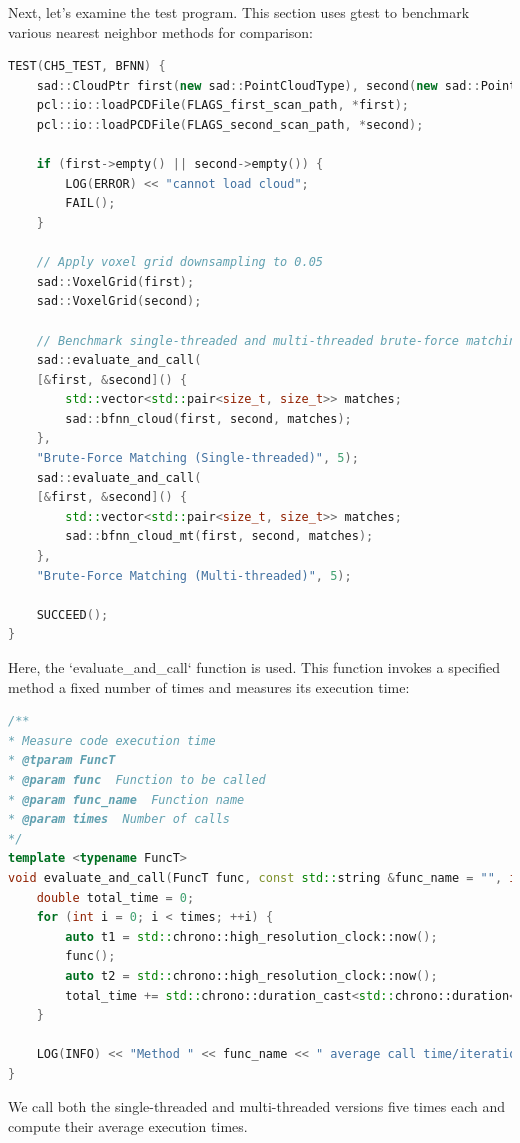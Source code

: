 Next, let's examine the test program. This section uses gtest to benchmark various nearest neighbor methods for comparison:

\begin{lstlisting}[language=c++,caption=src/ch5/test\_nn.cc]
TEST(CH5_TEST, BFNN) {
	sad::CloudPtr first(new sad::PointCloudType), second(new sad::PointCloudType);
	pcl::io::loadPCDFile(FLAGS_first_scan_path, *first);
	pcl::io::loadPCDFile(FLAGS_second_scan_path, *second);
	
	if (first->empty() || second->empty()) {
		LOG(ERROR) << "cannot load cloud";
		FAIL();
	}
	
	// Apply voxel grid downsampling to 0.05
	sad::VoxelGrid(first);
	sad::VoxelGrid(second);
	
	// Benchmark single-threaded and multi-threaded brute-force matching
	sad::evaluate_and_call(
	[&first, &second]() {
		std::vector<std::pair<size_t, size_t>> matches;
		sad::bfnn_cloud(first, second, matches);
	},
	"Brute-Force Matching (Single-threaded)", 5);
	sad::evaluate_and_call(
	[&first, &second]() {
		std::vector<std::pair<size_t, size_t>> matches;
		sad::bfnn_cloud_mt(first, second, matches);
	},
	"Brute-Force Matching (Multi-threaded)", 5);
	
	SUCCEED();
}
\end{lstlisting}

Here, the `evaluate_and_call` function is used. This function invokes a specified method a fixed number of times and measures its execution time:
\begin{lstlisting}[language=c++,caption=src/common/sys\_utils.h]
/**
* Measure code execution time
* @tparam FuncT
* @param func  Function to be called
* @param func_name  Function name
* @param times  Number of calls
*/
template <typename FuncT>
void evaluate_and_call(FuncT func, const std::string &func_name = "", int times = 10) {
	double total_time = 0;
	for (int i = 0; i < times; ++i) {
		auto t1 = std::chrono::high_resolution_clock::now();
		func();
		auto t2 = std::chrono::high_resolution_clock::now();
		total_time += std::chrono::duration_cast<std::chrono::duration<double>>(t2 - t1).count() * 1000;
	}
	
	LOG(INFO) << "Method " << func_name << " average call time/iterations: " << total_time / times << "/" << times << " ms.";
}
\end{lstlisting}

We call both the single-threaded and multi-threaded versions five times each and compute their average execution times.

